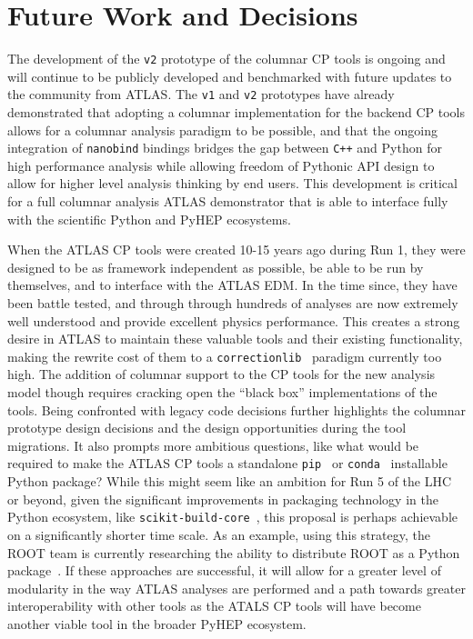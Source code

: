 \section{Future Work and Decisions}\label{sec:conclusions}

The development of the \texttt{v2} prototype of the columnar CP tools is ongoing and will continue to be publicly developed and benchmarked with future updates to the community from ATLAS.
The \texttt{v1} and \texttt{v2} prototypes have already demonstrated that adopting a columnar implementation for the backend CP tools allows for a columnar analysis paradigm to be possible, and that the ongoing integration of \texttt{nanobind} bindings bridges the gap between \texttt{C++} and Python for high performance analysis while allowing freedom of Pythonic API design to allow for higher level analysis thinking by end users.
This development is critical for a full columnar analysis ATLAS demonstrator that is able to interface fully with the scientific Python and PyHEP ecosystems.

When the ATLAS CP tools were created 10-15 years ago during Run 1, they were designed to be as framework independent as possible, be able to be run by themselves, and to interface with the ATLAS EDM.
In the time since, they have been battle tested, and through through hundreds of analyses are now extremely well understood and provide excellent physics performance.
This creates a strong desire in ATLAS to maintain these valuable tools and their existing functionality, making the rewrite cost of them to a \texttt{correctionlib}~\cite{correctionlib_2024} paradigm currently too high.
The addition of columnar support to the CP tools for the new analysis model though requires cracking open the ``black box'' implementations of the tools.
Being confronted with legacy code decisions further highlights the columnar prototype design decisions and the design opportunities during the tool migrations.
It also prompts more ambitious questions, like what would be required to make the ATLAS CP tools a standalone \texttt{pip}~\cite{pip_github} or \texttt{conda}~\cite{conda_software} installable Python package?
While this might seem like an ambition for Run 5 of the LHC or beyond, given the significant improvements in packaging technology in the Python ecosystem, like \texttt{scikit-build-core}~\cite{Schreiner_Scikit-build-core_2024}, this proposal is perhaps achievable on a significantly shorter time scale.
As an example, using this strategy, the ROOT team is currently researching the ability to distribute ROOT as a Python package~\cite{Padulano:CHEP_2024}.
If these approaches are successful, it will allow for a greater level of modularity in the way ATLAS analyses are performed and a path towards greater interoperability with other tools as the ATALS CP tools will have become another viable tool in the broader PyHEP ecosystem.
